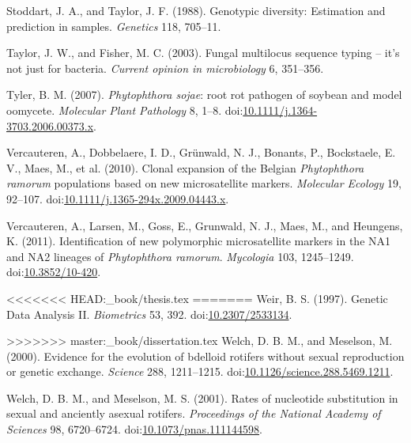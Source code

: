 \documentclass[double,12pt]{beavtex}
\begin{document}
  \hypertarget{ref-stoddart1988genotypic}{}
  Stoddart, J. A., and Taylor, J. F. (1988). Genotypic diversity:
  Estimation and prediction in samples. \emph{Genetics} 118, 705--11.
  
  \hypertarget{ref-taylor2003fungal}{}
  Taylor, J. W., and Fisher, M. C. (2003). Fungal multilocus sequence
  typing -- it's not just for bacteria. \emph{Current opinion in
  microbiology} 6, 351--356.
  
  \hypertarget{ref-tyler2007phytophthora}{}
  Tyler, B. M. (2007). \emph{Phytophthora sojae}: root rot pathogen of
  soybean and model oomycete. \emph{Molecular Plant Pathology} 8, 1--8.
  doi:\href{https://doi.org/10.1111/j.1364-3703.2006.00373.x}{10.1111/j.1364-3703.2006.00373.x}.
  
  \hypertarget{ref-vercauteren2010clonal}{}
  Vercauteren, A., Dobbelaere, I. D., Grünwald, N. J., Bonants, P.,
  Bockstaele, E. V., Maes, M., et al. (2010). Clonal expansion of the
  Belgian \emph{Phytophthora ramorum} populations based on new
  microsatellite markers. \emph{Molecular Ecology} 19, 92--107.
  doi:\href{https://doi.org/10.1111/j.1365-294x.2009.04443.x}{10.1111/j.1365-294x.2009.04443.x}.
  
  \hypertarget{ref-vercauteren2011identification}{}
  Vercauteren, A., Larsen, M., Goss, E., Grunwald, N. J., Maes, M., and
  Heungens, K. (2011). Identification of new polymorphic microsatellite
  markers in the NA1 and NA2 lineages of \emph{Phytophthora ramorum}.
  \emph{Mycologia} 103, 1245--1249.
  doi:\href{https://doi.org/10.3852/10-420}{10.3852/10-420}.
  
<<<<<<< HEAD:_book/thesis.tex
=======
  \hypertarget{ref-Weir_1997}{}
  Weir, B. S. (1997). Genetic Data Analysis II. \emph{Biometrics} 53, 392.
  doi:\href{https://doi.org/10.2307/2533134}{10.2307/2533134}.
  
>>>>>>> master:_book/dissertation.tex
  \hypertarget{ref-welch2000evidence}{}
  Welch, D. B. M., and Meselson, M. (2000). Evidence for the evolution of
  bdelloid rotifers without sexual reproduction or genetic exchange.
  \emph{Science} 288, 1211--1215.
  doi:\href{https://doi.org/10.1126/science.288.5469.1211}{10.1126/science.288.5469.1211}.
  
  \hypertarget{ref-welch2001rates}{}
  Welch, D. B. M., and Meselson, M. S. (2001). Rates of nucleotide
  substitution in sexual and anciently asexual rotifers. \emph{Proceedings
  of the National Academy of Sciences} 98, 6720--6724.
  doi:\href{https://doi.org/10.1073/pnas.111144598}{10.1073/pnas.111144598}.
  
\end{document}
